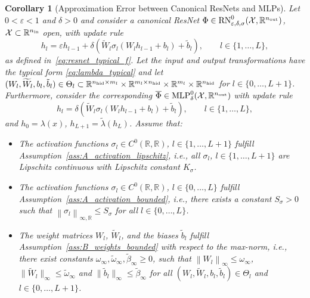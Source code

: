 \documentclass[10pt]{article}
\newtheorem{corollary}[theorem]{Corollary}
\theoremstyle{definition}
\numberwithin{equation}{section}
\newcommand{\eps}{\varepsilon}
\newcommand\norm[1]{\left\lVert#1\right\rVert}
\newcommand\normm[1]{\big\lVert#1\big\lVert}
\newcommand{\R}{\mathbb{R}}
\newcommand*{\nout}{n_\textup{out}}
\newcommand*{\nhid}{n_\textup{hid}}
\newcommand*{\nin}{n_\textup{in}}
\begin{document}
\begin{corollary}[Approximation Error between Canonical ResNets and MLPs] \label{cor:mlp_resnet_error}   
	Let $0<\eps<1$ and $\delta>0$ and consider a canonical ResNet $\Phi \in \textup{RN}^0_{\eps,\delta,\sigma}(\mathcal{X},\R^{\nout})$, $\mathcal{X}\subset \R^{\nin}$ open, with update rule
    \begin{equation*}\label{eq:resnet_updaterule_distance}
		h_l = \eps h_{l-1} + \delta \left(\widetilde{W}_l \sigma_l(W_l h_{l-1} + b_l) + \tilde{b}_l\right), \qquad l \in \{1,\ldots,L\},
	\end{equation*}
	as defined in~\eqref{eq:resnet_typical_f}.
	Let the input and output transformations have the typical form \eqref{eq:lambda_typical} and let
    $(W_l,\widetilde{W}_l,b_l,\tilde{b}_l)\in \Theta_l \subset \R^{\nhid\times m_l} \times \R^{m_l \times \nhid} \times \R^{m_l} \times \R^{\nhid}$ for $l \in \{0,\ldots,L+1\}$.
	Furthermore, consider the corresponding $\overline{\Phi} \in \textup{MLP}^0_{\delta}(\mathcal{X},\R^{\nout})$ with update rule
	\begin{equation*}
		h_l = \delta\left(\widetilde{W}_l \sigma_l(W_l h_{l-1} + b_l) + \tilde{b}_l \right), \qquad l \in \{1,\ldots,L\},
	\end{equation*}
	and $h_0 = \lambda(x)$, $h_{L+1} = \tilde{\lambda}(h_L)$. Assume that:
	\begin{itemize}
		\item The activation functions $\sigma_{l}\in C^0(\R,\R)$, $l\in\{1,\ldots,L+1\}$ fulfill Assumption~\ref{ass:A_activation_lipschitz}, i.e., all $\sigma_{l}$, $l\in\{1,\ldots,L+1\}$ are Lipschitz continuous with Lipschitz constant $K_\sigma$.
		\item The activation functions $\sigma_{l}\in C^0(\R,\R)$, $l\in \{0,\ldots,L\}$ fulfill Assumption~\ref{ass:A_activation_bounded}, i.e., there exists a constant $S_\sigma > 0$ such that $\norm{\sigma_l}_{\infty,\R} \leq S_\sigma$ for all $l \in \{0,\ldots,L\}$.
		\item  The weight matrices $W_l$, $\widetilde{W}_l$, and the biases $\tilde{b}_l$ fulfill Assumption~\ref{ass:B_weights_bounded} with respect to the max-norm, i.e., there exist constants $\omega_\infty, \widetilde{\omega}_\infty, \tilde{\beta}_\infty \geq 0$, such that $\norm{W_l}_\infty\leq \omega_\infty$, $\normm{\widetilde{W}_l}_\infty \leq \widetilde{\omega}_\infty $ and $\normm{\tilde{b}_l}_\infty \leq \tilde{\beta}_\infty$ for all $(W_l,\widetilde{W}_l,b_l,\tilde{b}_l)\in \Theta_l$ and $l\in \{0,\ldots,L+1\}$.

\end{itemize}
\end{corollary}
\end{document}

